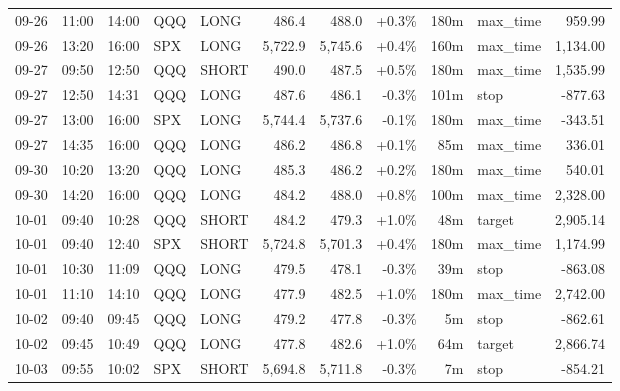 \documentclass[11pt,a4paper,twoside]{article}
\begin{document}
\begin{center}
\begin{longtable}{>{\color{txtmain}}l l l l l r r r r >{\color{txtmain}}l r}
09-26 & 11:00 & 14:00 & QQQ & LONG & 486.4 & 488.0 & \textcolor{wingreen}{+0.3\%} & 180m & max\_time & \textcolor{wingreen}{959.99} \\
09-26 & 13:20 & 16:00 & SPX & LONG & 5,722.9 & 5,745.6 & \textcolor{wingreen}{+0.4\%} & 160m & max\_time & \textcolor{wingreen}{1,134.00} \\
09-27 & 09:50 & 12:50 & QQQ & SHORT & 490.0 & 487.5 & \textcolor{wingreen}{+0.5\%} & 180m & max\_time & \textcolor{wingreen}{1,535.99} \\
09-27 & 12:50 & 14:31 & QQQ & LONG & 487.6 & 486.1 & \textcolor{lossred}{-0.3\%} & 101m & stop & \textcolor{lossred}{-877.63} \\
09-27 & 13:00 & 16:00 & SPX & LONG & 5,744.4 & 5,737.6 & \textcolor{lossred}{-0.1\%} & 180m & max\_time & \textcolor{lossred}{-343.51} \\
09-27 & 14:35 & 16:00 & QQQ & LONG & 486.2 & 486.8 & \textcolor{wingreen}{+0.1\%} & 85m & max\_time & \textcolor{wingreen}{336.01} \\
09-30 & 10:20 & 13:20 & QQQ & LONG & 485.3 & 486.2 & \textcolor{wingreen}{+0.2\%} & 180m & max\_time & \textcolor{wingreen}{540.01} \\
09-30 & 14:20 & 16:00 & QQQ & LONG & 484.2 & 488.0 & \textcolor{wingreen}{+0.8\%} & 100m & max\_time & \textcolor{wingreen}{2,328.00} \\
10-01 & 09:40 & 10:28 & QQQ & SHORT & 484.2 & 479.3 & \textcolor{wingreen}{+1.0\%} & 48m & target & \textcolor{wingreen}{2,905.14} \\
10-01 & 09:40 & 12:40 & SPX & SHORT & 5,724.8 & 5,701.3 & \textcolor{wingreen}{+0.4\%} & 180m & max\_time & \textcolor{wingreen}{1,174.99} \\
10-01 & 10:30 & 11:09 & QQQ & LONG & 479.5 & 478.1 & \textcolor{lossred}{-0.3\%} & 39m & stop & \textcolor{lossred}{-863.08} \\
10-01 & 11:10 & 14:10 & QQQ & LONG & 477.9 & 482.5 & \textcolor{wingreen}{+1.0\%} & 180m & max\_time & \textcolor{wingreen}{2,742.00} \\
10-02 & 09:40 & 09:45 & QQQ & LONG & 479.2 & 477.8 & \textcolor{lossred}{-0.3\%} & 5m & stop & \textcolor{lossred}{-862.61} \\
10-02 & 09:45 & 10:49 & QQQ & LONG & 477.8 & 482.6 & \textcolor{wingreen}{+1.0\%} & 64m & target & \textcolor{wingreen}{2,866.74} \\
10-03 & 09:55 & 10:02 & SPX & SHORT & 5,694.8 & 5,711.8 & \textcolor{lossred}{-0.3\%} & 7m & stop & \textcolor{lossred}{-854.21} \\

\end{longtable}
\end{center}
\end{document}
